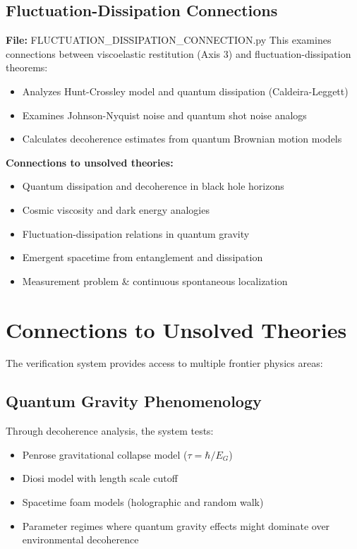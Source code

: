 \documentclass[11pt]{article}
\begin{document}
\subsection{Fluctuation-Dissipation Connections}
\textbf{File:} FLUCTUATION\_DISSIPATION\_CONNECTION.py
This examines connections between viscoelastic restitution (Axis 3) and fluctuation-dissipation theorems:
\begin{itemize}
\item Analyzes Hunt-Crossley model and quantum dissipation (Caldeira-Leggett)
\item Examines Johnson-Nyquist noise and quantum shot noise analogs
\item Calculates decoherence estimates from quantum Brownian motion models
\end{itemize}
\textbf{Connections to unsolved theories:}
\begin{itemize}
\item Quantum dissipation and decoherence in black hole horizons
\item Cosmic viscosity and dark energy analogies
\item Fluctuation-dissipation relations in quantum gravity
\item Emergent spacetime from entanglement and dissipation
\item Measurement problem \& continuous spontaneous localization
\end{itemize}

\section{Connections to Unsolved Theories}
The verification system provides access to multiple frontier physics areas:

\subsection{Quantum Gravity Phenomenology}
Through decoherence analysis, the system tests:
\begin{itemize}
\item Penrose gravitational collapse model ($\tau = \hbar/E_G$)
\item Diosi model with length scale cutoff
\item Spacetime foam models (holographic and random walk)
\item Parameter regimes where quantum gravity effects might dominate over environmental decoherence
\end{itemize}
\end{document}
